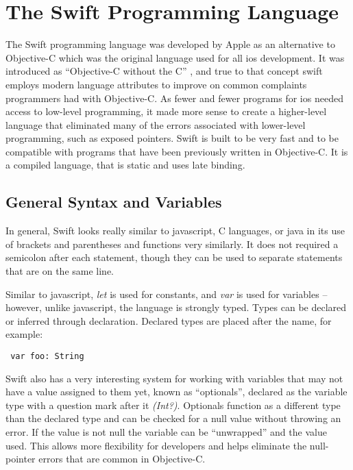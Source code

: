 \documentclass{article}
\begin{document}
     


\section{The Swift Programming Language}
The Swift programming language was developed by Apple as an alternative to Objective-C which was the original language used for all ios development. It was introduced as “Objective-C without the C” \cite{SwiftPL}, and true to that concept swift employs modern language attributes to improve on common complaints programmers had with Objective-C. As fewer and fewer programs for ios needed access to low-level programming, it made more sense to create a higher-level language that eliminated many of the errors associated with lower-level programming, such as exposed pointers. Swift is built to be very fast and to be compatible with programs that have been previously written in Objective-C. It is a compiled language, that is static and uses late binding.

\subsection{General Syntax and Variables  \cite{Swift}}
In general, Swift looks really similar to javascript, C languages, or java in its use of brackets and parentheses and functions very similarly. It does not required a semicolon after each statement, though they can be used to separate statements that are on the same line. 

\vskip 0.2in

Similar to javascript,  \emph{let} is used for constants, and \emph{var} is used for variables -- however, unlike javascript,  the language is strongly typed. Types can be declared or inferred through declaration. Declared types are placed after the name, for example: \par

\begin{verbatim} var foo: String \end{verbatim} 

Swift also has a very interesting system for working with variables that may not have a value assigned to them yet, known as “optionals”, declared as the variable type with a question mark after it \emph{(Int?)}.  Optionals function as a different type than the declared type and can be checked for a null value without throwing an error. If the value is not null the variable can be “unwrapped” and the value used. This allows more flexibility for developers and helps eliminate the null-pointer errors that are common in Objective-C. \par
\end{document}
